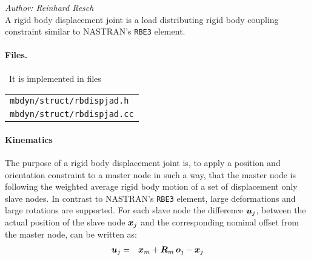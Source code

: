%
%
%
%
%
%
%
%
\emph{Author: Reinhard Resch} \\
A rigid body displacement joint is a load distributing rigid body coupling constraint similar to NASTRAN's \texttt{RBE3} element.
\paragraph{Files.} \
It is implemented in files

\begin{tabular}{l}
\texttt{mbdyn/struct/rbdispjad.h} \\
\texttt{mbdyn/struct/rbdispjad.cc}
\end{tabular}

\paragraph{Kinematics}
The purpose of a rigid body displacement joint is, to apply a position and orientation constraint to a master node in such a way,
that the master node is following the weighted average rigid body motion of a set of displacement only slave nodes.
In contrast to NASTRAN's \texttt{RBE3} element, large deformations and large rotations are supported.
For each slave node the difference $\bm{u}_j$, between the actual position of the slave node $\bm{x}_j$ and the corresponding nominal offset
from the master node, can be written as:
\begin{eqnarray}
\bm{u}_j & = & \bm{x}_m + \bm{R}_m \, \bm{o}_j- \bm{x}_j \label{eq:rbdispjoint:u}
\end{eqnarray}

